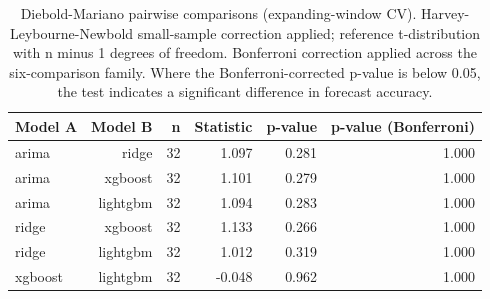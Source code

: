 \begin{table}
\caption{Diebold-Mariano pairwise comparisons (expanding-window CV). Harvey-Leybourne-Newbold small-sample correction applied; reference t-distribution with n minus 1 degrees of freedom. Bonferroni correction applied across the six-comparison family. Where the Bonferroni-corrected p-value is below 0.05, the test indicates a significant difference in forecast accuracy.}
\begin{tabular}{lrrrrr}
\toprule
Model A & Model B & n & Statistic & p-value & p-value (Bonferroni) \\
\midrule
arima & ridge & 32 & 1.097 & 0.281 & 1.000 \\
arima & xgboost & 32 & 1.101 & 0.279 & 1.000 \\
arima & lightgbm & 32 & 1.094 & 0.283 & 1.000 \\
ridge & xgboost & 32 & 1.133 & 0.266 & 1.000 \\
ridge & lightgbm & 32 & 1.012 & 0.319 & 1.000 \\
xgboost & lightgbm & 32 & -0.048 & 0.962 & 1.000 \\
\bottomrule
\end{tabular}
\end{table}